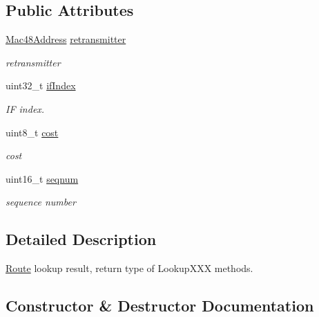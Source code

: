 \subsection*{Public Attributes}
\begin{DoxyCompactItemize}
\item 
\hyperlink{classns3_1_1Mac48Address}{Mac48\+Address} \hyperlink{structns3_1_1flame_1_1FlameRtable_1_1LookupResult_af180198f1e8e3583a49c63a983991822}{retransmitter}
\begin{DoxyCompactList}\small\item\em retransmitter \end{DoxyCompactList}\item 
uint32\+\_\+t \hyperlink{structns3_1_1flame_1_1FlameRtable_1_1LookupResult_a8b742221f0db31d18510533dfb231892}{if\+Index}
\begin{DoxyCompactList}\small\item\em IF index. \end{DoxyCompactList}\item 
uint8\+\_\+t \hyperlink{structns3_1_1flame_1_1FlameRtable_1_1LookupResult_afeb81c285c3213ab67fb359c558f3e2e}{cost}
\begin{DoxyCompactList}\small\item\em cost \end{DoxyCompactList}\item 
uint16\+\_\+t \hyperlink{structns3_1_1flame_1_1FlameRtable_1_1LookupResult_aa97819ae916abeff16ecbfc163f9cc30}{seqnum}
\begin{DoxyCompactList}\small\item\em sequence number \end{DoxyCompactList}\end{DoxyCompactItemize}


\subsection{Detailed Description}
\hyperlink{structns3_1_1flame_1_1FlameRtable_1_1Route}{Route} lookup result, return type of Lookup\+X\+XX methods. 

\subsection{Constructor \& Destructor Documentation}

